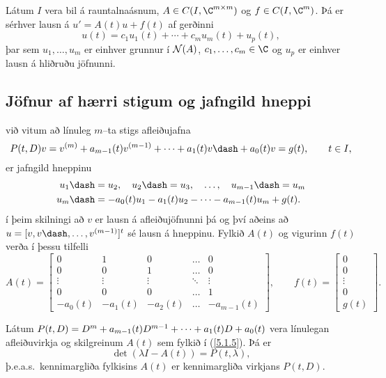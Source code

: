 \begin{se}  
Látum $I$ vera bil á rauntalnaásnum, $A\in C(I,\C\sp
{m\times m})$ og $f\in C(I,\C\sp m)$.
Þá er sérhver lausn á $u'=A(t)u+f(t)$ af gerðinni
$$ u(t)=c_1u_1(t)+\cdots+c_mu_m(t)+u_p(t),$$
þar sem $u_1,\dots,u_m$ er einhver grunnur í ${\cal N}(A)$,
$c_1,\dots,c_m\in\C$ og $u_p$ er einhver lausn á hliðruðu jöfnunni.
\end{se}

\subsection*{Jöfnur af hærri stigum  og jafngild hneppi}

við vitum að línuleg $m$--ta stigs afleiðujafna
 \begin{equation*}
P(t,D)v= v\sp{(m)}+a_{m-1}(t)v\sp{(m-1)}+\cdots+a_1(t)v\dash
+a_0(t)v=g(t), \qquad t\in I, \label{5.1.3}
\end{equation*} 
er jafngild hneppinu
\begin{align*}
u_1\dash &= u_2,\quad
u_2\dash = u_3,\quad
\dots, \quad u_{m-1}\dash = u_m\label{5.1.4}\\
u_m\dash &=-a_0(t)u_1-a_1(t)u_2-\cdots-a_{m-1}(t)u_m+g(t).\nonumber
\end{align*}
í þeim skilningi að $v$ er lausn á afleiðujöfnunni þá og því aðeins að
$u=[v,v\dash,\dots,v^{(m-1)}]^t$ sé lausn á hneppinu.
Fylkið $A(t)$ og vigurinn $f(t)$ verða í þessu tilfelli 
\begin{equation*}A(t)=\left[\begin{matrix}
0&1&0&\dots&0\\
0&0&1&\dots&0\\
\vdots&\vdots&\vdots&\ddots&\vdots\\
0&0&0&\dots&1\\
-a_0(t)&-a_1(t)&-a_2(t)&\dots&-a_{m-1}(t)
\end{matrix}\right],
\qquad
f(t)=\left[\begin{matrix}
0\\
0\\
\vdots\\
0\\
g(t)
\end{matrix}\right].\label{5.1.5}
\end{equation*}

\begin{se} Látum  $P(t,D)=D\sp m+a_{m-1}(t)D\sp{m-1}+\cdots+a_1(t)D+a_0(t)$
vera línulegan afleiðuvirkja og skilgreinum $A(t)$ sem fylkið í
(\ref{5.1.5}).  Þá er
$$\det(\lambda I-A(t))=P(t,\lambda),$$
þ.e.a.s.~kennimargliða
fylkisins $A(t)$ er kennimargliða
virkjans $P(t,D)$.
\end{se}



